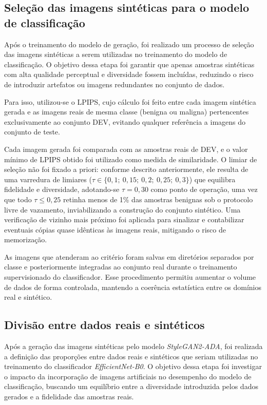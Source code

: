 \documentclass[
	12pt,				%
	openright,			%
	oneside,			%
	a4paper,			%
	tcc,			%
	]{ABNT-DC-UEL}
\begin{document}
\subsection{Seleção das imagens sintéticas para o modelo de classificação}

Após o treinamento do modelo de geração, foi realizado um processo de seleção das imagens sintéticas a serem utilizadas no treinamento do modelo de classificação. O objetivo dessa etapa foi garantir que apenas amostras sintéticas com alta qualidade perceptual e diversidade fossem incluídas, reduzindo o risco de introduzir artefatos ou imagens redundantes no conjunto de dados.

Para isso, utilizou-se o LPIPS, cujo cálculo foi feito entre cada imagem sintética gerada e as imagens reais de mesma classe (benigna ou maligna) pertencentes exclusivamente ao conjunto DEV, evitando qualquer referência a imagens do conjunto de teste.

Cada imagem gerada foi comparada com as amostras reais de DEV, e o valor mínimo de LPIPS obtido foi utilizado como medida de similaridade. O limiar de seleção não foi fixado a priori: conforme descrito anteriormente, ele resulta de uma varredura de limiares ($\tau \in \{0{,}1;\ 0{,}15;\ 0{,}2;\ 0{,}25;\ 0{,}3\}$) que equilibra fidelidade e diversidade, adotando-se $\tau = 0{,}30$ como ponto de operação, uma vez que todo $\tau \le 0{,}25$ retinha menos de 1\% das amostras benignas sob o protocolo livre de vazamento, inviabilizando a construção do conjunto sintético. Uma verificação de vizinho mais próximo foi aplicada para sinalizar e contabilizar eventuais cópias quase idênticas às imagens reais, mitigando o risco de memorização.

As imagens que atenderam ao critério foram salvas em diretórios separados por classe e posteriormente integradas ao conjunto real durante o treinamento supervisionado do classificador. Esse procedimento permitiu aumentar o volume de dados de forma controlada, mantendo a coerência estatística entre os domínios real e sintético.

\subsection{Divisão entre dados reais e sintéticos}

Após a geração das imagens sintéticas pelo modelo \textit{StyleGAN2-ADA}, foi realizada a definição das proporções entre dados reais e sintéticos que seriam utilizadas no treinamento do classificador \textit{EfficientNet-B0}. O objetivo dessa etapa foi investigar o impacto da incorporação de imagens artificiais no desempenho do modelo de classificação, buscando um equilíbrio entre a diversidade introduzida pelos dados gerados e a fidelidade das amostras reais.
\end{document}

